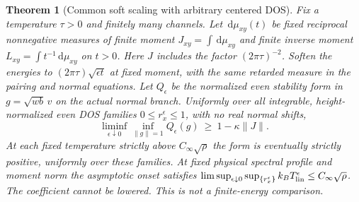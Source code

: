 \documentclass[11pt]{article}
\newtheorem{theorem}{Theorem}
\newcommand{\dd}{\,\mathrm{d}}
\newcommand{\Cinf}{C_\infty}
\newcommand{\Tlin}{T_{\rm lin}}
\begin{document}
\begin{theorem}[Common soft scaling with arbitrary centered DOS]\label{thm:soft-phys}
Fix a temperature $\tau>0$ and finitely many channels. Let $\dd\mu_{xy}(t)$ be fixed reciprocal nonnegative measures of finite moment $J_{xy}=\int\dd\mu_{xy}$ and finite inverse moment $L_{xy}=\int t^{-1}\dd\mu_{xy}$ on $t>0$. Here $J$ includes the factor $(2\pi\tau)^{-2}$. Soften the energies to $(2\pi\tau)\sqrt{\epsilon t}$ at fixed moment, with the same retarded measure in the pairing and normal equations. Let $Q_\epsilon$ be the normalized even stability form in $g=\sqrt{w b}\,v$ on the actual normal branch. Uniformly over all integrable, height-normalized even DOS families $0\le r_x^\epsilon\le1$, with no real normal shifts,
\[
 \liminf_{\epsilon\downarrow0}\inf_{\|g\|=1}Q_\epsilon(g)
 \ \ge\ 1-\kappa\|J\| .
\]
At each fixed temperature strictly above $\Cinf\sqrt{\rho}$ the form is eventually strictly positive, uniformly over these families. At fixed physical spectral profile and moment norm the asymptotic onset satisfies $\limsup_{\epsilon\downarrow0}\sup_{\{r_x^\epsilon\}} k_B\Tlin^\epsilon\le\Cinf\sqrt{\rho}$. The coefficient cannot be lowered. This is not a finite-energy comparison.
\end{theorem}
\end{document}
